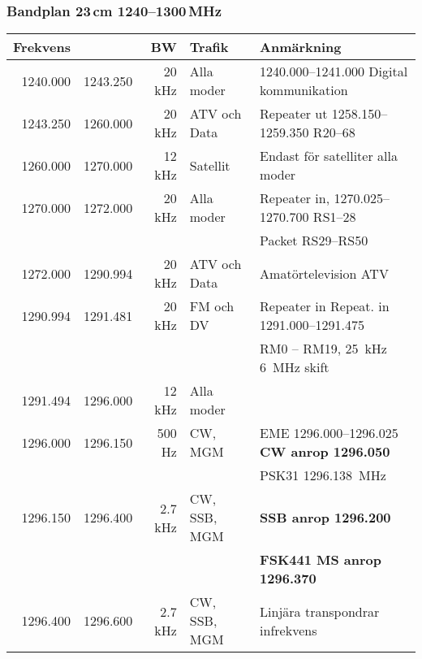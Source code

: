 \subsubsection{Bandplan 23\,cm 1240--1300\,MHz}
\begin{tabular}{rrrll}
	\textbf{Frekvens} &          & \textbf{BW} & \textbf{Trafik} & \textbf{Anmärkning}          \\ \hline
        
	         1240.000 & 1243.250 & 20 kHz  & Alla moder   & \numrange{1240,000}{1241,000} Digital kommunikation  \\ \hline
	         1243.250 & 1260.000 & 20 kHz  & ATV och Data & Repeater ut \numrange{1258,150}{1259,350}  R20--68   \\ \hline
	         1260.000 & 1270.000 & 12 kHz  & Satellit     & Endast för satelliter alla moder                     \\ \hline
	         1270.000 & 1272.000 & 20 kHz  & Alla moder   & Repeater in, \numrange{1270,025}{1270,700} RS1--28   \\
	                  &          &         &              & Packet RS29--RS50                                    \\ \hline
	         1272.000 & 1290.994 & 20 kHz  & ATV och Data & Amatörtelevision ATV                                 \\ \hline
	         1290.994 & 1291.481 & 20 kHz  & FM och DV    & Repeater in Repeat. in \numrange{1291,000}{1291,475} \\
	                  &          &         &              & RM0 – RM19, \SI{25}{kHz} \SI{6}{MHz} skift          \\ \hline
	         1291.494 & 1296.000 & 12 kHz  & Alla moder   &                                                      \\ \hline
	         1296.000 & 1296.150 & 500 Hz  & CW,  MGM     & EME \numrange{1296,000}{1296,025} \textbf{CW anrop 1296.050}        \\
	                  &          &         &              & PSK31 \SI{1296,138}{MHz}                                   \\ \hline
	         1296.150 & 1296.400 & 2.7 kHz & CW, SSB, MGM & \textbf{SSB anrop \num{1296,200}}                          \\
	                  &          &         &              & \textbf{FSK441 MS anrop \num{1296,370}}                    \\ \hline
	         1296.400 & 1296.600 & 2.7 kHz & CW, SSB, MGM & Linjära transpondrar infrekvens                      \\ \hline

\end{tabular}
